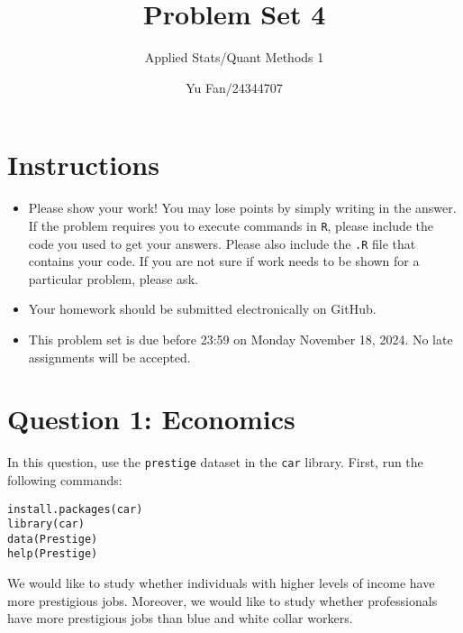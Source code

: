 \documentclass[12pt,letterpaper]{article}
\title{Problem Set 4}
\date{Yu Fan/24344707}
\author{Applied Stats/Quant Methods 1}
\begin{document}
	\maketitle
	\section*{Instructions}
	\begin{itemize}
		\item Please show your work! You may lose points by simply writing in the answer. If the problem requires you to execute commands in \texttt{R}, please include the code you used to get your answers. Please also include the \texttt{.R} file that contains your code. If you are not sure if work needs to be shown for a particular problem, please ask.
		\item Your homework should be submitted electronically on GitHub.
		\item This problem set is due before 23:59 on Monday November 18, 2024. No late assignments will be accepted.
	\end{itemize}



	\vspace{.5cm}
\section*{Question 1: Economics}
\vspace{.25cm}
\noindent 	
In this question, use the \texttt{prestige} dataset in the \texttt{car} library. First, run the following commands:

\begin{verbatim}
install.packages(car)
library(car)
data(Prestige)
help(Prestige)
\end{verbatim} 


\noindent We would like to study whether individuals with higher levels of income have more prestigious jobs. Moreover, we would like to study whether professionals have more prestigious jobs than blue and white collar workers.
\end{document}
